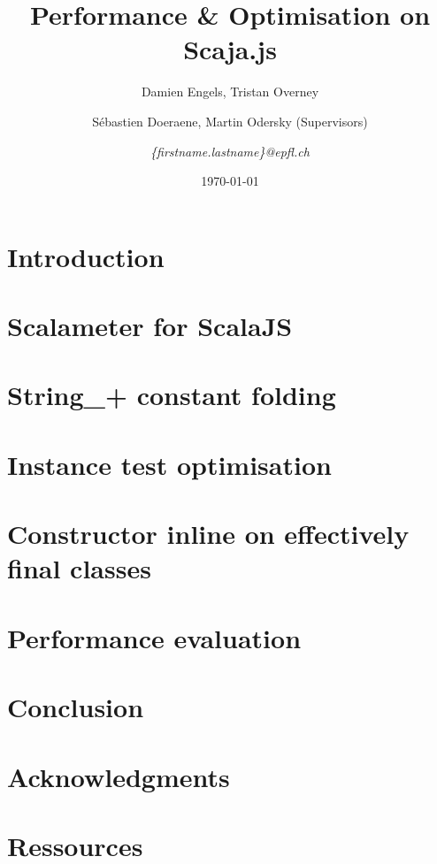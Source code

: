 \documentclass{article}
\begin{document}
\title{Performance \& Optimisation on Scaja.js}
\author{Damien Engels, Tristan Overney\and S\'{e}bastien Doeraene, Martin
Odersky (Supervisors)\and \emph{\{firstname.lastname\}@epfl.ch}}
\date{\today}
\maketitle

\nocite{*}

\section{Introduction}


\section{Scalameter for ScalaJS} \label{scalameter}


\section{String\_+ constant folding}


\section{Instance test optimisation}


\section{Constructor inline on effectively final classes}


\section{Performance evaluation}


\section{Conclusion}


\section*{Acknowledgments}


\section*{Ressources}


{}

\end{document}
